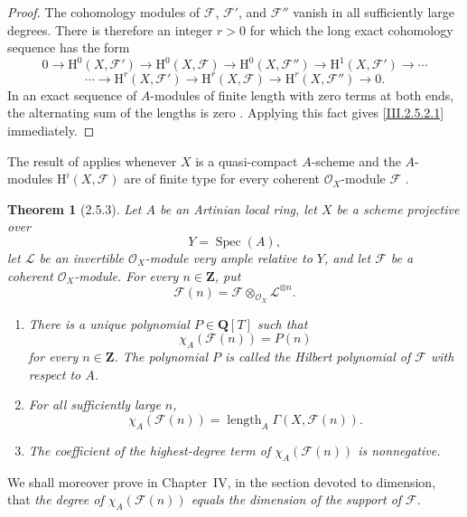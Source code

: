 \documentclass[oneside]{amsart}
\theoremstyle{ega-env-style}
\theoremstyle{ega-thm-env-style}
\newtheorem*{theorem}{Theorem}
\theoremstyle{ega-defn-env-style}
\def\mathcal{\mathscr}
\def\sh{\mathcal}                   %
\def\bb{\mathbf}                    %
\def\HH{\mathrm{H}}                 %
\def\Spec{\operatorname{Spec}}
\let\EGAOriginalLabel\label
\renewcommand{\label}[1]{\phantomsection\EGAOriginalLabel{#1}}
\begin{document}
\begin{proof}
The cohomology modules of $\sh{F}$, $\sh{F}'$, and $\sh{F}''$ vanish in all sufficiently large degrees.
There is therefore an integer $r>0$ for which the long exact cohomology sequence has the form
\[
  0\longrightarrow\HH^0(X,\sh{F}')
  \longrightarrow\HH^0(X,\sh{F})
  \longrightarrow\HH^0(X,\sh{F}'')
  \longrightarrow\HH^1(X,\sh{F}')
  \longrightarrow\cdots
\]
\[
  \cdots\longrightarrow\HH^r(X,\sh{F}')
  \longrightarrow\HH^r(X,\sh{F})
  \longrightarrow\HH^r(X,\sh{F}'')
  \longrightarrow0.
\]
In an exact sequence of $A$-modules of finite length with zero terms at both ends, the alternating sum of the lengths is zero .
Applying this fact gives \eqref{III.2.5.2.1} immediately.
\end{proof}

The result of  applies whenever $X$ is a quasi-compact $A$-scheme and the $A$-modules $\HH^i(X,\sh{F})$ are of finite type for every coherent $\sh{O}_X$-module $\sh{F}$ .

\begin{theorem}[2.5.3]
\label{III.2.5.3}
Let $A$ be an Artinian local ring, let $X$ be a scheme projective over
\[
  Y=\Spec(A),
\]
let $\sh{L}$ be an invertible $\sh{O}_X$-module very ample relative to $Y$, and let $\sh{F}$ be a coherent $\sh{O}_X$-module.
For every $n\in\bb Z$, put
\[
  \sh{F}(n)=\sh{F}\otimes_{\sh{O}_X}\sh{L}^{\otimes n}.
\]
\begin{enumerate}
  \item[(i)] There is a unique polynomial $P\in\bb Q[T]$ such that
  \[
    \chi_A(\sh{F}(n))=P(n)
  \]
  for every $n\in\bb Z$.
  The polynomial $P$ is called the \emph{Hilbert polynomial} of $\sh{F}$ with respect to $A$.

  \item[(ii)] For all sufficiently large $n$,
  \[
    \chi_A(\sh{F}(n))
    =
    \operatorname{length}_A\Gamma(X,\sh{F}(n)).
  \]

  \item[(iii)] The coefficient of the highest-degree term of $\chi_A(\sh{F}(n))$ is nonnegative.
\end{enumerate}
\end{theorem}

We shall moreover prove in Chapter~IV, in the section devoted to dimension, that \emph{the degree of $\chi_A(\sh{F}(n))$ equals the dimension of the support of $\sh{F}$}.
\end{document}
